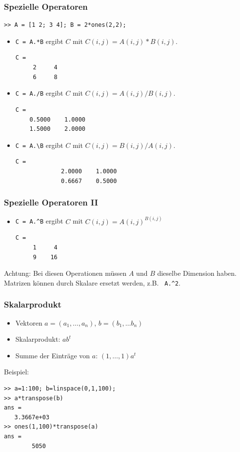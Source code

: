 %
%
\begin{frame}[fragile]\frametitle{Spezielle  Operatoren}
\begin{lstlisting}
>> A = [1 2; 3 4]; B = 2*ones(2,2);
\end{lstlisting}
\begin{itemize}
\item \lstinline!C = A.*B! ergibt $C$ mit $C(i,j)=A(i,j)*B(i,j)$.
\begin{lstlisting}[basicstyle=\tiny]
C =
     2     4
     6     8
\end{lstlisting}
\item \lstinline!C = A./B! ergibt $C$ mit $C(i,j)=A(i,j)/B(i,j)$.
\begin{lstlisting}[basicstyle=\tiny]
C =
    0.5000    1.0000
    1.5000    2.0000
\end{lstlisting}
\item \lstinline!C = A.\B! ergibt $C$ mit $C(i,j)=B(i,j)/A(i,j)$.
\begin{lstlisting}[basicstyle=\tiny]
         C =
             2.0000    1.0000
             0.6667    0.5000
\end{lstlisting}
\end{itemize}
\end{frame}
%
%
\begin{frame}[fragile]\frametitle{Spezielle Operatoren II}
\begin{itemize}
\item \lstinline!C = A.^B! ergibt $C$ mit $C(i,j)=A(i,j)^{B(i,j)}$
\begin{lstlisting}
C =
     1     4
     9    16
\end{lstlisting}
\end{itemize}
\alert{Achtung:} Bei diesen  Operationen müssen $A$ und $B$
dieselbe Dimension haben.  Matrizen können durch
Skalare ersetzt werden, z.B. \lstinline! A.^2!.
\end{frame}
%
%
\begin{frame}[fragile]\frametitle{Skalarprodukt}
\begin{itemize}
 \item Vektoren $a=(a_1, \dots ,a_n)$, $b=(b_1, \dots b_n)$ \\
\item Skalarprodukt: $a b^t$\\
\item Summe der Einträge von $a$: $(1, \dots , 1) a^t$\\
\end{itemize}
Beispiel:
\begin{lstlisting}
>> a=1:100; b=linspace(0,1,100);
>> a*transpose(b)
ans =
   3.3667e+03
>> ones(1,100)*transpose(a)
ans =
        5050
\end{lstlisting}  

\end{frame}

